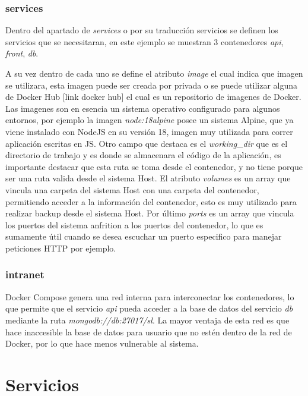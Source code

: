 \subsubsection*{services}

Dentro del apartado de \textit{services} o por su traducción servicios se definen los servicios que se necesitaran, en este ejemplo se muestran 3 contenedores \textit{api}, \textit{front}, \textit{db}.

A su vez dentro de cada uno se define el atributo \textit{image} el cual indica que imagen se utilizara, esta imagen puede ser creada por privada o se puede utilizar alguna de Docker Hub [link docker hub] el cual es un repositorio de imagenes de Docker.
Las imagenes son en esencia un sistema operativo configurado para algunos entornos, por ejemplo la imagen \textit{node:18\-alpine} posee un sistema Alpine, que ya viene instalado con NodeJS en su versión 18, imagen muy utilizada para correr aplicación escritas en JS.
Otro campo que destaca es el \textit{working\_dir} que es el directorio de trabajo y es donde se almacenara el código de la aplicación, es importante destacar que esta ruta se toma desde el contenedor, y no tiene porque ser una ruta valida desde el sistema Host.
El atributo \textit{volumes} es un array que vincula una carpeta del sistema Host con una carpeta del contenedor, permitiendo acceder a la información del contenedor, esto es muy utilizado para realizar backup desde el sistema Host.
Por último \textit{ports} es un array que vincula los puertos del sistema anfrition a los puertos del contenedor, lo que es sumamente útil cuando se desea escuchar un puerto especifico para manejar peticiones HTTP por ejemplo.

\subsubsection*{intranet}

Docker Compose genera una red interna para interconectar los contenedores, lo que permite que el servicio \textit{api} pueda acceder a la base de datos del servicio \textit{db} mediante la ruta \textit{mongodb://db:27017/sl}. La mayor ventaja de esta red es que hace inaccesible la base de datos para usuario que no estén dentro de la red de Docker, por lo que hace menos vulnerable al sistema.

\section{Servicios}


